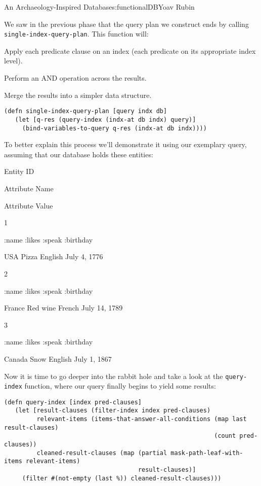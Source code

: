 \begin{aosachapter}{An Archaeology-Inspired Database}{s:functionalDB}{Yoav Rubin}
\label{phase-3-execution-of-the-plan}

We saw in the previous phase that the query plan we construct ends by
calling \texttt{single-index-query-plan}. This function will:

\begin{aosaenumerate}
\def\labelenumi{\arabic{enumi}.}

\item
  Apply each predicate clause on an index (each predicate on its
  appropriate index level).
\item
  Perform an AND operation across the results.
\item
  Merge the results into a simpler data structure.
\end{aosaenumerate}

\begin{verbatim}
(defn single-index-query-plan [query indx db]
   (let [q-res (query-index (indx-at db indx) query)]
     (bind-variables-to-query q-res (indx-at db indx))))
\end{verbatim}

To better explain this process we'll demonstrate it using our exemplary
query, assuming that our database holds these entities:

Entity ID

Attribute Name

Attribute Value

1

:name :likes :speak :birthday

USA Pizza English July 4, 1776

2

:name :likes :speak :birthday

France Red wine French July 14, 1789

3

:name :likes :speak :birthday

Canada Snow English July 1, 1867

Now it is time to go deeper into the rabbit hole and take a look at the
\texttt{query-index} function, where our query finally begins to yield
some results:

\begin{verbatim}
(defn query-index [index pred-clauses]
   (let [result-clauses (filter-index index pred-clauses)
         relevant-items (items-that-answer-all-conditions (map last result-clauses) 
                                                          (count pred-clauses))
         cleaned-result-clauses (map (partial mask-path-leaf-with-items relevant-items)
                                     result-clauses)] 
     (filter #(not-empty (last %)) cleaned-result-clauses)))
\end{verbatim}


\end{aosachapter}
